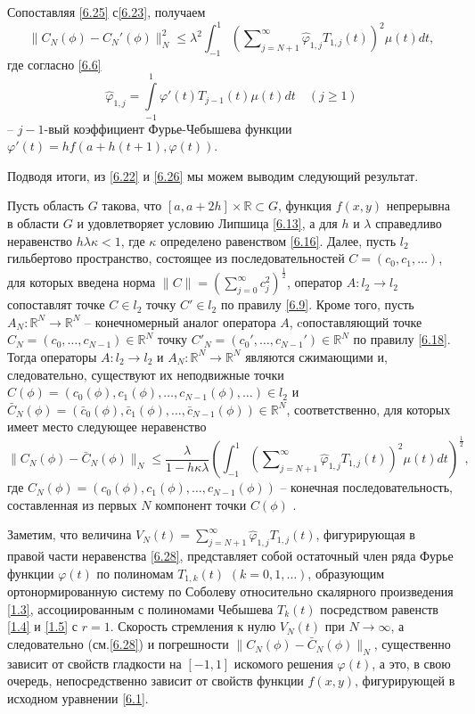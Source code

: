 Сопоставляя \eqref{6.25} с\eqref{6.23}, получаем
\begin{equation}\label{6.26}
\|C_N(\phi)- C_N'(\phi)\|_N^2\le \lambda^2\int_{-1}^1\left(\sum\nolimits_{j=N+1}^\infty \hat \varphi_{1,j}T_{1,j}(t)\right)^2 \mu(t)dt,
\end{equation}
где согласно \eqref{6.6}
\begin{equation}\label{6.27}
 \hat \varphi_{1,j}=\int\limits_{-1}^1\varphi'(t)T_{j-1}(t)\mu(t)dt \quad(j\ge1)
\end{equation}
-- $j-1$-вый коэффициент Фурье-Чебышева функции $\varphi'(t)=hf(a+h(t+1),\varphi(t))$.

Подводя итоги, из \eqref{6.22} и \eqref{6.26}  мы можем выводим следующий результат.
\begin{theorem} Пусть область $G$ такова, что $[a,a+2h]\times\mathbb{R}\subset G$, функция $f(x,y)$ непрерывна в области $G$ и удовлетворяет условию Липшица \eqref{6.13}, а для $h$ и $\lambda$ справедливо неравенство $h\lambda\kappa<1$, где $\kappa$ определено равенством \eqref{6.16}. Далее, пусть $l_2$ гильбертово пространство, состоящее из последовательностей $C=(c_0,c_1,\ldots)$, для которых введена норма $\|C\|=\left(\sum_{j=0}^\infty c_j^2\right)^\frac12$,   оператор $A: l_2\to l_2$ сопоставлят точке $C\in l_2$ точку $C'\in l_2$ по правилу \eqref{6.9}. Кроме того, пусть $A_N:\mathbb{R}^N\to \mathbb{R}^N$ -- конечномерный аналог оператора $A$, cопоставляющий точке $C_N=(c_0,\ldots,c_{N-1})\in \mathbb{R}^N $ точку  $C'_N=(c_0',\ldots,c_{N-1}')\in \mathbb{R}^N $ по правилу \eqref{6.18}.
Тогда операторы $A: l_2\to l_2$ и $A_N:\mathbb{R}^N\to \mathbb{R}^N$ являются сжимающими и, следовательно, существуют их неподвижные точки $C(\phi)=(c_0(\phi),c_1(\phi),\ldots,c_{N-1}(\phi),\ldots)\in l_2$ и $\bar C_N(\phi)=(\bar c_0(\phi),\bar c_1(\phi),\ldots,\bar c_{N-1}(\phi))\in \mathbb{R}^N$, соответственно, для которых имеет место следующее неравенство
\begin{equation}\label{6.28}
\|C_N(\phi)-\bar C_N(\phi)\|_N\le \frac\lambda{1-h\kappa\lambda}\left(\int_{-1}^1\left(\sum\nolimits_{j=N+1}^\infty \hat \varphi_{1,j}T_{1,j}(t)\right)^2 \mu(t)dt\right)^\frac12,
\end{equation}
где $C_N(\phi)=(c_0(\phi),c_1(\phi),\ldots,c_{N-1}(\phi))$ -- конечная последовательность, составленная из первых $N$ компонент точки  $C(\phi)$ .
\end{theorem}



Заметим, что величина $V_N(t)=\sum\nolimits_{j=N+1}^\infty \hat \varphi_{1,j}T_{1,j}(t)$,
фигурирующая в правой части неравенства \eqref{6.28}, представляет собой остаточный член ряда Фурье функции $\varphi(t)$ по полиномам $T_{1,k}(t)$ $(k=0,1,\ldots)$, образующим ортонормированную систему по Соболеву относительно скалярного произведения \eqref{1.3}, ассоциированным с полиномами Чебышева $T_k(t)$ посредством равенств \eqref{1.4} и \eqref{1.5} с $r=1$. Скорость стремления к нулю $V_N(t)$ при $N\to\infty$, а следовательно (см.\eqref{6.28}) и погрешности $\|C_N(\phi)- \bar C_N(\phi)\|_N$, существенно зависит от свойств гладкости на $[-1,1]$ искомого решения $\varphi(t)$, а это, в свою очередь, непосредственно зависит от свойств функции $f(x,y)$, фигурирующей в исходном уравнении \eqref{6.1}.

